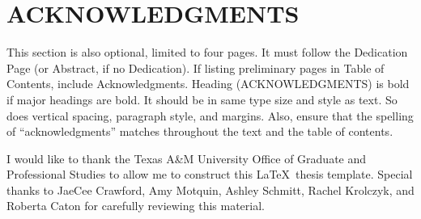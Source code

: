 %
%
%


\chapter*{ACKNOWLEDGMENTS}


\indent This section is also optional, limited to four pages. It must follow the Dedication Page (or Abstract, if no Dedication). If listing preliminary pages in Table of Contents, include Acknowledgments. Heading (\MakeUppercase{Acknowledgments}) is bold if major headings are bold. It should be in same type size and style as text. So does vertical spacing, paragraph style, and margins. Also, ensure that the spelling of ``acknowledgments'' matches throughout the text and the table of contents.

I would like to thank the Texas A\&M University Office of Graduate and Professional Studies to allow me to construct this \LaTeX\ thesis template. Special thanks to JaeCee Crawford, Amy Motquin, Ashley Schmitt, Rachel Krolczyk, and Roberta Caton for carefully reviewing this material.  %



\pagebreak{}